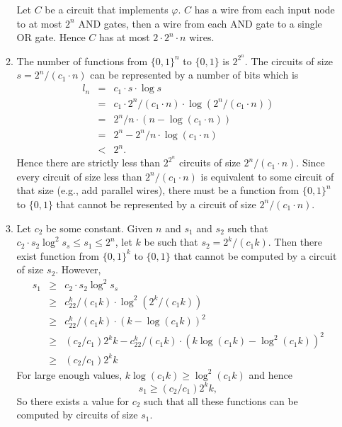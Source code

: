 \documentclass[11pt]{article} \usepackage{amssymb}
\renewcommand{\phi}{\varphi}
\begin{document}
\begin{enumerate}
\begin{enumerate}
      Let $C$ be a circuit that implements $\phi$. $C$ has a wire from
      each input node to at most $2^n$ AND gates, then a wire from each AND
      gate to a single OR gate. Hence $C$ has at most 
      $2\cdot 2^n \cdot n$ wires.

    \item The number of functions from $\{0,1\}^n$ to $\{0,1\}$ is $2^{2^n}$.
      The circuits
      of size $s=2^n/(c_1\cdot n)$ can be represented by a number of bits which is
      \begin{eqnarray*}
        l_n&=&c_1\cdot s\cdot \log s
        \\ &=& c_1\cdot 2^n/(c_1\cdot n)\cdot \log \left(2^n/(c_1\cdot n)\right)
        \\ &=& 2^n/n\cdot \left(n - \log \left(c_1\cdot n\right)\right)
        \\ &=& 2^n - 2^n/n\cdot \log \left(c_1\cdot n\right)
        \\ &<& 2^n.
      \end{eqnarray*}
      Hence there are strictly less than $2^{2^n}$ circuits of size
      $2^n/(c_1\cdot n)$. Since every circuit of size less than $2^n/(c_1\cdot n)$ is
      equivalent to some circuit of that size (e.g., add parallel wires), 
      there must be a function
      from $\{0,1\}^n$ to $\{0,1\}$ that cannot be represented by a
      circuit of size $2^n/(c_1\cdot n)$.

      \item
        Let $c_2$ be some constant.
        Given $n$ and $s_1$ and $s_2$ such that 
        $c_2 \cdot s_2\log^2s_s\leq s_1\leq 2^n$, let $k$ be such that $s_2=2^k/(c_1k)$. 
        Then there exist function from $\{0,1\}^k$ to $\{0,1\}$ that cannot
        be computed by a circuit of size $s_2$. However,
        \begin{eqnarray*}
          s_1&\geq& c_2 \cdot s_2\log^2s_s
          \\ &\geq& c_22^k/(c_1k) \cdot \log^2\left(2^k/(c_1k)\right)
          \\ &\geq& c_22^k/(c_1k) \cdot \left(k-\log(c_1k)\right)^2
          \\ &\geq& (c_2/c_1)2^kk - c_22^k/(c_1k)\cdot\left(k\log(c_1k)-\log^2(c_1k)\right)^2
          \\ &\geq& (c_2/c_1)2^kk
        \end{eqnarray*}
        For large enough values, $k\log(c_1k)\geq \log^2(c_1k)$ and hence
        \begin{equation*}
          s_1 \geq (c_2/c_1)2^kk,
        \end{equation*}
        So there exists a value for $c_2$ such that all these functions
        can be computed by circuits of size $s_1$.



\end{enumerate}
\end{enumerate}
\end{document}
